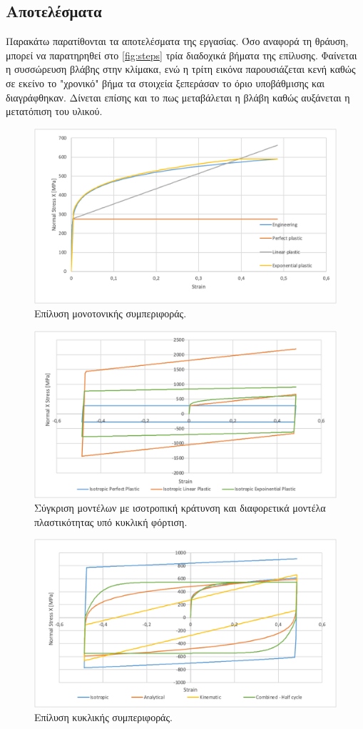 \documentclass{article}
\begin{document}
\subsection{Αποτελέσματα}
Παρακάτω παρατίθονται τα αποτελέσματα της εργασίας. Όσο αναφορά τη θράυση, μπορεί να παρατηρηθεί στο \ref{fig:steps} τρία διαδοχικά βήματα της επίλυσης. Φαίνεται η συσσώρευση βλάβης στην κλίμακα, ενώ η τρίτη εικόνα παρουσιάζεται κενή καθώς σε εκείνο το "χρονικό" βήμα τα στοιχεία ξεπεράσαν το όριο υποβάθμισης και διαγράφθηκαν. Δίνεται επίσης και το πως μεταβάλεται η βλάβη καθώς αυξάνεται η μετατόπιση του υλικού.
\begin{figure}[H]
    \centering
    \includegraphics[width=0.7\linewidth]{media/static.png}
    \caption{Επίλυση μονοτονικής συμπεριφοράς.}
    \label{fig:static}
\end{figure}

\begin{figure}[H]
    \centering
    \includegraphics[width=0.7\linewidth]{media/dynamic-iso.png}
    \caption{Σύγκριση μοντέλων με ισοτροπική κράτυνση και διαφορετικά μοντέλα πλαστικότητας υπό κυκλική φόρτιση.}
    \label{fig:dyniso}
\end{figure}

\begin{figure}[H]
    \centering
    \includegraphics[width=0.7\linewidth]{media/dynamic.png}
    \caption{Επίλυση κυκλικής συμπεριφοράς.}
    \label{fig:dyn}
\end{figure}
\end{document}
